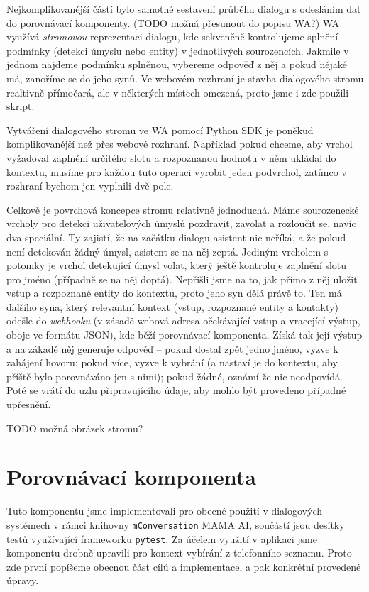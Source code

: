 Nejkomplikovanější částí bylo samotné sestavení průběhu dialogu s odesláním
dat do porovnávací komponenty. (TODO možná přesunout do popisu WA?) WA využívá
\textit{stromovou} reprezentaci dialogu,
kde sekvenčně kontrolujeme splnění podmínky (detekci úmyslu nebo entity) v
jednotlivých sourozencích. Jakmile v jednom najdeme podmínku splněnou, vybereme
odpověď z něj a pokud nějaké má, zanoříme se do jeho synů. Ve webovém rozhraní je
stavba dialogového stromu realtivně přímočará, ale v některých místech omezená,
proto jsme i zde použili skript.

Vytváření dialogového stromu ve WA pomocí Python SDK je poněkud komplikovanější
než přes webové rozhraní. Například pokud chceme, aby vrchol vyžadoval zaplnění
určitého slotu a rozpoznanou hodnotu v něm ukládal do kontextu, musíme pro
každou tuto operaci vyrobit jeden podvrchol, zatímco v rozhraní bychom jen
vyplnili dvě pole.

Celkově je povrchová koncepce stromu relativně jednoduchá. Máme sourozenecké
vrcholy pro detekci uživatelových úmyslů pozdravit, zavolat a rozloučit se, navíc
dva speciální. Ty zajistí, že na začátku dialogu asistent nic neříká, a že
pokud není detekován žádný úmysl, asistent se na něj zeptá. Jediným vrcholem
s potomky je vrchol detekující úmysl volat, který ještě kontroluje zaplnění slotu
pro jméno (případně se na něj doptá). Nepřišli jsme na to, jak přímo z něj
uložit vstup a rozpoznané entity do kontextu, proto jeho syn dělá právě to. Ten
má dalšího syna, který relevantní kontext (vstup, rozpoznané entity a kontakty)
odešle do \textit{webhooku} (v zásadě webová adresa očekávající vstup a vracející
výstup, oboje ve formátu JSON), kde běží porovnávací komponenta. Získá tak její
výstup a na zákadě něj generuje odpověď -- pokud dostal zpět jedno jméno,
vyzve k zahájení hovoru; pokud více, vyzve k vybrání (a nastaví je do kontextu,
aby příště bylo porovnáváno jen s nimi); pokud žádné, oznámí že nic neodpovídá.
Poté se vrátí do uzlu připravujícího údaje, aby mohlo být provedeno případné
upřesnění.

TODO možná obrázek stromu?

\section{Porovnávací komponenta}

Tuto komponentu jsme implementovali pro obecné použití v dialogových systémech
v rámci knihovny \texttt{mConversation} MAMA AI, součástí jsou desítky testů
využívající frameworku \texttt{pytest}. Za účelem využití v aplikaci jsme komponentu
drobně upravili pro kontext vybírání z telefonního seznamu. Proto zde první popíšeme
obecnou část cílů a implementace, a pak konkrétní provedené úpravy.


